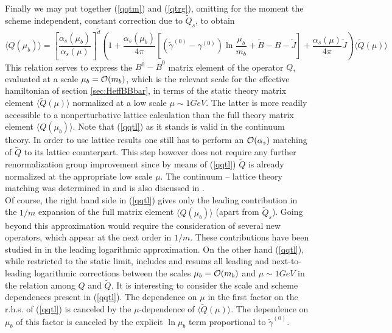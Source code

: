 Finally we may put together (\ref{qqtm}) and (\ref{qtrg}), omitting
for the moment the scheme independent, constant correction due to
$\tilde Q_s$, to obtain 
\begin{equation}\label{qqtl}
\langle Q(\mu_b)\rangle=
\left[\frac{\alpha_s(\mu_b)}{\alpha_s(\mu)}\right]^{\tilde d}
\left(1+\frac{\alpha_s(\mu_b)}{4\pi}
\left[(\tilde\gamma^{(0)}-\gamma^{(0)})\ln\frac{\mu_b}{m_b}+\tilde B-B
-\tilde J\right]+\frac{\alpha_s(\mu)}{4\pi}\tilde J\right)
\langle\tilde Q(\mu)\rangle
\end{equation}
This relation serves to express the $B^0-\bar B^0$ matrix element of the
operator $Q$, evaluated at a scale $\mu_b={\cal O}(m_b)$, which is the
relevant scale for the effective hamiltonian of section 
\ref{sec:HeffBBbar}, in terms of the static theory matrix element
$\langle\tilde Q(\mu)\rangle$ normalized at a low scale $\mu\sim 1 GeV$.
The latter is more readily accessible to a nonperturbative lattice
calculation than the full theory matrix element $\langle Q(\mu_b)\rangle$.
Note that (\ref{qqtl}) as it stands is valid in the continuum theory.
In order to use lattice results one still has to perform an ${\cal
O}(\alpha_s)$ matching of $\tilde Q$ to its lattice counterpart. This
step however does not require any further renormalization group
improvement since by means of (\ref{qqtl}) $\tilde Q$ is already
normalized at the appropriate low scale $\mu$.  The continuum --
lattice theory matching was determined in \cite{flynnetal:91} and is
also discussed in \cite{gimenez:93}.
\\
Of course, the right hand side in (\ref{qqtl}) gives only the leading
contribution in the $1/m$ expansion of the full matrix element $\langle
Q(\mu_b)\rangle$ (apart from $\tilde Q_s$). Going beyond this
approximation would require the consideration of several new operators,
which appear at the next order in $1/m$.  These contributions have been
studied in \cite{kilianmannel:93} in the leading logarithmic
approximation. On the other hand (\ref{qqtl}), while restricted to the
static limit, includes and resums all leading and next-to-leading
logarithmic corrections between the scales $\mu_b={\cal O}(m_b)$ and
$\mu\sim 1GeV$ in the relation among $Q$ and $\tilde Q$. It is
interesting to consider the scale and scheme dependences present in
(\ref{qqtl}). The dependence on $\mu$ in the first factor on the r.h.s.
of (\ref{qqtl}) is canceled by the $\mu$-dependence of $\langle\tilde
Q(\mu)\rangle$. The dependence on $\mu_b$ of this factor is canceled by
the explicit $\ln\mu_b$ term proportional to $\tilde\gamma^{(0)}$.

